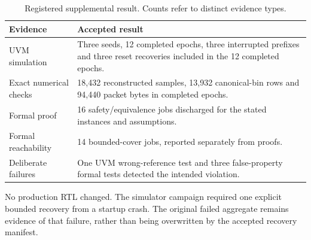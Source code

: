 \begin{table}[htbp]\centering
\caption{Registered supplemental result. Counts refer to distinct evidence types.}
\begin{tabularx}{\linewidth}{P{1.5in}L}\toprule
Evidence & Accepted result\\\midrule
UVM simulation & Three seeds, 12 completed epochs, three interrupted prefixes and three reset recoveries included in the 12 completed epochs.\\
Exact numerical checks & 18,432 reconstructed samples, 13,932 canonical-bin rows and 94,440 packet bytes in completed epochs.\\
Formal proof & 16 safety/equivalence jobs discharged for the stated instances and assumptions.\\
Formal reachability & 14 bounded-cover jobs, reported separately from proofs.\\
Deliberate failures & One UVM wrong-reference test and three false-property formal tests detected the intended violation.\\\bottomrule
\end{tabularx}\end{table}
No production RTL changed. The simulator campaign required one explicit bounded recovery from a startup crash. The original failed aggregate remains evidence of that failure, rather than being overwritten by the accepted recovery manifest.
